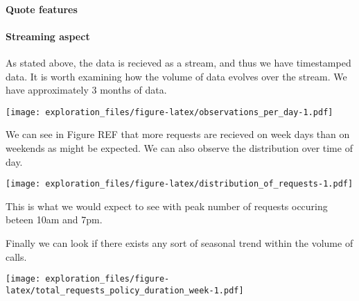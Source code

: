 \paragraph{Quote features}\label{quote-features}

\paragraph{Streaming aspect}\label{streaming-aspect}

As stated above, the data is recieved as a stream, and thus we have
timestamped data. It is worth examining how the volume of data evolves
over the stream. We have approximately 3 months of data.

\texttt{[image: exploration\_files/figure-latex/observations\_per\_day-1.pdf]}

We can see in Figure REF that more requests are recieved on week days
than on weekends as might be expected. We can also observe the
distribution over time of day.

\texttt{[image: exploration\_files/figure-latex/distribution\_of\_requests-1.pdf]}

This is what we would expect to see with peak number of requests
occuring beteen 10am and 7pm.

Finally we can look if there exists any sort of seasonal trend within
the volume of calls.

\texttt{[image: exploration\_files/figure-latex/total\_requests\_policy\_duration\_week-1.pdf]}

%
